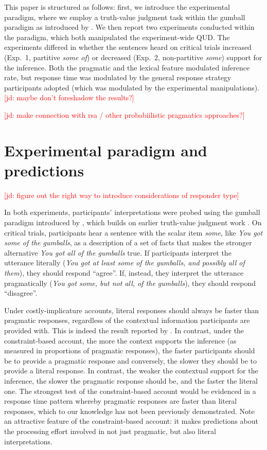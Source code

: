 \documentclass[10pt,letterpaper]{article}
\newcommand{\jd}[1]{\textcolor{Red}{[jd: #1]}}
\begin{document}
This paper is structured as follows: first, we introduce the experimental paradigm, where we employ a truth-value judgment task within the gumball paradigm as introduced by . We then report two experiments conducted within the paradigm, which both manipulated the experiment-wide QUD. The experiments differed in whether the sentences heard on critical trials increased (Exp.~1, partitive \emph{some of}) or decreased (Exp.~2, non-partitive \emph{some}) support for the inference. Both the pragmatic and the lexical feature modulated inference rate, but response time was modulated by the general response strategy participants adopted (which was modulated by the experimental manipulations).\jd{maybe don't foreshadow the results?}

\jd{make connection with rsa / other probabiilistic pragmatics approaches?}

\section{Experimental paradigm and predictions}

\jd{figure out the right way to introduce considerations of responder type} 

In both experiments, participants' interpretations were probed using the gumball paradigm introduced by , which builds on earlier truth-value judgment work \cite{BottNoveck2004}. On critical trials, participants hear a sentence with the scalar item \emph{some}, like \emph{You got some of the gumballs}, as a description of a set of facts that makes the stronger alternative \emph{You got all of the gumballs} true. If participants interpret the utterance literally (\emph{You got at least some of the gumballs, and possibly all of them}), they should respond ``agree''. If, instead, they interpret the utterance pragmatically (\emph{You got some, but not all, of the gumballs}), they should respond ``disagree''. 

Under costly-implicature accounts, literal responses should always be faster than pragmatic responses, regardless of the contextual information participants are provided with. This is indeed the result reported by . In contrast, under the constraint-based account, the more the context supports the inference (as measured in proportions of pragmatic responses), the faster participants should be to provide a pragmatic response and conversely, the slower they should be to provide a literal response. In contrast, the weaker the contextual support for the inference, the slower the pragmatic response should be, and the faster the literal one. The strongest test of the constraint-based account would be evidenced in a response time pattern whereby pragmatic responses are faster than literal responses, which to our knowledge has not been previously demonstrated. Note an attractive feature of the constraint-based account: it makes predictions about the processing effort involved in not just pragmatic, but also literal interpretations.
\end{document}
